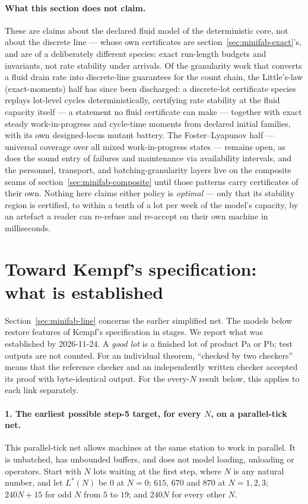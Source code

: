 \paragraph{What this section does not claim.} These are claims about
the declared fluid model of the deterministic core, not about the
discrete line --- whose own certificates are
section~\ref{sec:minifab-exact}'s, and are of a deliberately
different species: exact run-length budgets and invariants, not rate
stability under arrivals. Of the granularity work that converts a
fluid drain rate into discrete-line guarantees for the count chain,
the Little's-law (exact-moments) half has since been discharged: a
discrete-lot certificate species replays lot-level cycles
deterministically, certifying rate stability at the fluid capacity
itself --- a statement no fluid certificate can make --- together
with exact steady work-in-progress and cycle-time moments from
declared initial families, with its own designed-locus mutant
battery. The Foster--Lyapunov half --- universal coverage over all
mixed work-in-progress states --- remains open, as does the sound
entry of failures and maintenance via availability intervals, and
the personnel, transport, and batching-granularity layers live on
the composite seams of section~\ref{sec:minifab-composite} until
those patterns carry certificates of their own. Nothing here claims either policy is
\emph{optimal} --- only that its stability region is certified, to
within a tenth of a lot per week of the model's capacity, by an
artefact a reader can re-refuse and re-accept on their own machine in
milliseconds.

\section{Toward Kempf's specification: what is established}
\label{sec:minifab-kempf}

Section~\ref{sec:minifab-line} concerns the earlier simplified net.
The models below restore features of Kempf's specification in stages.
We report what was established by 2026-11-24. A \emph{good lot} is a
finished lot of product Pa or Pb; test outputs are not counted. For an
individual theorem, ``checked by two checkers'' means that the reference
checker and an independently written checker accepted its proof with
byte-identical output. For the every-$N$ result below, this applies to
each link separately.

\paragraph{1. The earliest possible step-5 target, for every $N$, on a
parallel-tick net.}\label{par:minifab-kempf-everyN}
This parallel-tick net allows machines at the same station to work in
parallel. It is unbatched, has unbounded buffers, and does not model
loading, unloading or operators. Start with $N$ lots waiting at the
first step, where $N$ is any natural number, and let $L^\ast(N)$ be
$0$ at $N = 0$; $615$, $670$ and $870$ at $N = 1, 2, 3$;
$240N + 15$ for odd $N$ from $5$ to $19$; and $240N$ for every other
$N$.

